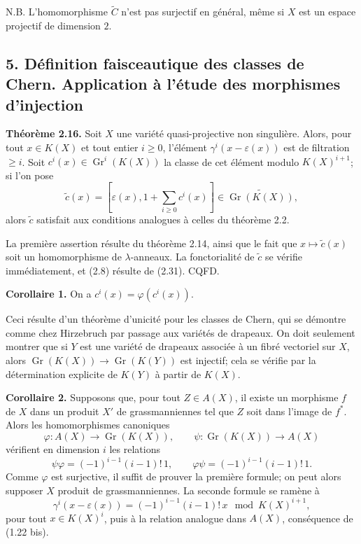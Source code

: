 \documentclass[11pt]{article}
\newcommand{\Gr}{\operatorname{Gr}}
\providecommand{\Gr}{\operatorname{Gr}}
\providecommand{\Ctil}{\widetilde C}
\providecommand{\Gr}{\operatorname{G}}
\begin{document}
N.B. L'homomorphisme $\Ctil$ n'est pas surjectif en général, même si $X$ est un espace projectif de dimension $2$.

\subsection*{5. Définition faisceautique des classes de Chern. Application à l'étude des morphismes d'injection}

\textbf{Théorème 2.16.} Soit $X$ une variété quasi-projective non singulière. Alors, pour tout $x\in K(X)$ et tout entier $i\geq0$, l'élément $\gamma^i(x-\varepsilon(x))$ est de filtration $\geq i$. Soit $c^i(x)\in\Gr^i(K(X))$ la classe de cet élément modulo $K(X)^{i+1}$; si l'on pose
\[
 \widetilde c(x)=\left[\varepsilon(x),1+\sum_{i\geq0}c^i(x)\right]\in\widetilde{\Gr(K(X))},
\]
alors $\widetilde c$ satisfait aux conditions analogues à celles du théorème 2.2.

La première assertion résulte du théorème 2.14, ainsi que le fait que $x\mapsto\widetilde c(x)$ soit un homomorphisme de $\lambda$-anneaux. La fonctorialité de $\widetilde c$ se vérifie immédiatement, et (2.8) résulte de (2.31). CQFD.

\textbf{Corollaire 1.} On a $c^i(x)=\varphi(c^i(x))$.

Ceci résulte d'un théorème d'unicité pour les classes de Chern, qui se démontre comme chez Hirzebruch par passage aux variétés de drapeaux. On doit seulement montrer que si $Y$ est une variété de drapeaux associée à un fibré vectoriel sur $X$, alors $\Gr(K(X))\to\Gr(K(Y))$ est injectif; cela se vérifie par la détermination explicite de $K(Y)$ à partir de $K(X)$.

\textbf{Corollaire 2.} Supposons que, pour tout $Z\in A(X)$, il existe un morphisme $f$ de $X$ dans un produit $X'$ de grassmanniennes tel que $Z$ soit dans l'image de $f^*$. Alors les homomorphismes canoniques
\[
 \varphi:A(X)\to\Gr(K(X)),\qquad \psi:\Gr(K(X))\to A(X)
\]
vérifient en dimension $i$ les relations
\begin{equation}\tag{2.35}
 \psi\varphi=(-1)^{i-1}(i-1)!\,1,
 \qquad
 \varphi\psi=(-1)^{i-1}(i-1)!\,1.
\end{equation}
Comme $\varphi$ est surjective, il suffit de prouver la première formule; on peut alors supposer $X$ produit de grassmanniennes. La seconde formule se ramène à
\[
 \gamma^i(x-\varepsilon(x))=(-1)^{i-1}(i-1)!\,x\mod K(X)^{i+1},
\]
pour tout $x\in K(X)^i$, puis à la relation analogue dans $A(X)$, conséquence de (1.22 bis).
\end{document}
